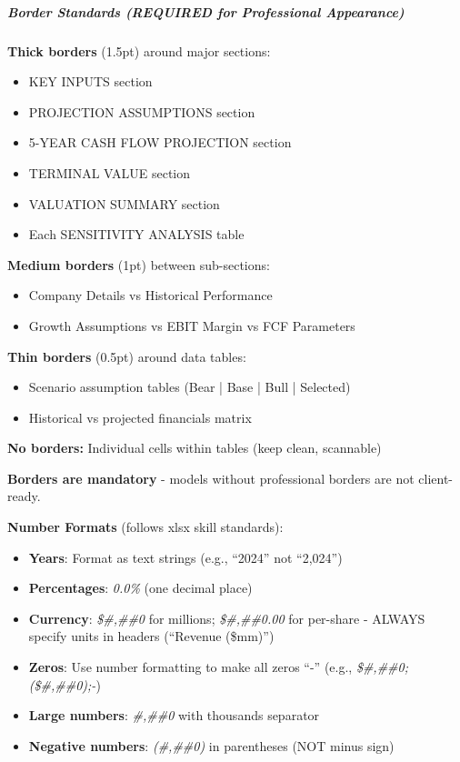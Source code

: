 \documentclass[11pt]{article}
\begin{document}
\subparagraph{Border Standards (REQUIRED for Professional Appearance)}\mbox{}\par

\textbf{Thick borders} (1.5pt) around major sections:

\begin{itemize}[leftmargin=*,itemsep=2pt,topsep=2pt]
\item {} KEY INPUTS section
\item {} PROJECTION ASSUMPTIONS section
\item {} 5-YEAR CASH FLOW PROJECTION section
\item {} TERMINAL VALUE section
\item {} VALUATION SUMMARY section
\item {} Each SENSITIVITY ANALYSIS table
\end{itemize}

\textbf{Medium borders} (1pt) between sub-sections:

\begin{itemize}[leftmargin=*,itemsep=2pt,topsep=2pt]
\item {} Company Details vs Historical Performance
\item {} Growth Assumptions vs EBIT Margin vs FCF Parameters
\end{itemize}

\textbf{Thin borders} (0.5pt) around data tables:

\begin{itemize}[leftmargin=*,itemsep=2pt,topsep=2pt]
\item {} Scenario assumption tables (Bear | Base | Bull | Selected)
\item {} Historical vs projected financials matrix
\end{itemize}

\textbf{No borders:} Individual cells within tables (keep clean, scannable)


\textbf{Borders are mandatory} - models without professional borders are not client-ready.


\textbf{Number Formats} (follows xlsx skill standards):

\begin{itemize}[leftmargin=*,itemsep=2pt,topsep=2pt]
\item {} \textbf{Years}: Format as text strings (e.g., ``2024'' not ``2,024'')
\item {} \textbf{Percentages}: \emph{0.0\%} (one decimal place)
\item {} \textbf{Currency}: \emph{\$\#,\#\#0} for millions; \emph{\$\#,\#\#0.00} for per-share - ALWAYS specify units in headers (``Revenue (\$mm)'')
\item {} \textbf{Zeros}: Use number formatting to make all zeros ``-'' (e.g., \emph{\$\#,\#\#0;(\$\#,\#\#0);-})
\item {} \textbf{Large numbers}: \emph{\#,\#\#0} with thousands separator
\item {} \textbf{Negative numbers}: \emph{(\#,\#\#0)} in parentheses (NOT minus sign)
\end{itemize}
\end{document}
